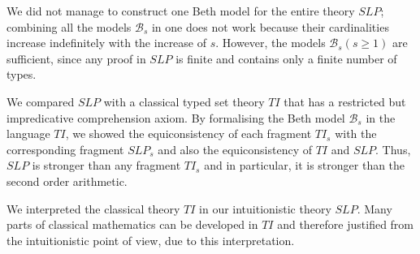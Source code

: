 \documentclass{asl}
\theoremstyle{definition}
\begin{document}
We did not manage to construct one Beth model for the entire theory $SLP$; combining all the models $\mathcal{B}_s$ in one does not work because their cardinalities increase indefinitely with the increase of $s$. However, the models $\mathcal{B}_s (s\geqslant 1)$ are sufficient, since any proof in $SLP$ is finite and contains only a finite number of types.

We compared $SLP$ with a classical typed set theory $TI$ that has a restricted but impredicative comprehension axiom. By formalising the Beth model $\mathcal{B}_s$  in the language $TI$, we showed the equiconsistency of each fragment $TI_s$ with the corresponding fragment $SLP_s$ and also the equiconsistency of $TI$ and $SLP$. Thus, $SLP$ is stronger than any fragment $TI_s$ and in particular, it is stronger than the second order arithmetic. 

We interpreted the classical theory $TI$ in our intuitionistic theory $SLP$. Many parts of classical mathematics can be developed in $TI$ and therefore justified from the intuitionistic point of view, due to this interpretation.



\end{document}
